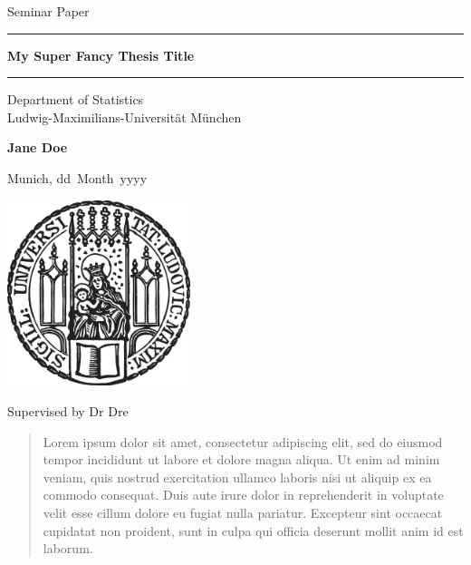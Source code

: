 \documentclass[
]{scrartcl}
\author{}
\date{\vspace{-2.5em}}
\newcommand{\mytitle}{My Super Fancy Thesis Title}
\newcommand{\myname}{Jane Doe}
\newcommand{\mysupervisor}{Dr Dre}
\newcommand{\dueday}{dd}
\newcommand{\duemonth}{Month}
\newcommand{\dueyear}{yyyy}
\begin{document}

\begin{titlepage}
\begin{center}

\LARGE
Seminar Paper

\vspace{0.5cm}

\rule{\textwidth}{1.5pt}
\LARGE
\textbf{\mytitle}
\rule{\textwidth}{1.5pt}

\vspace{0.5cm}

\large
Department of Statistics \\
Ludwig-Maximilians-Universität München

\vfill

\Large
\textbf{\myname}

\vfill

\large
Munich, \dueday~\duemonth~\dueyear

\vfill

\includegraphics[width = 0.4\textwidth]{params/sigillum.png}

\vfill

\normalsize


Supervised by \mysupervisor

\end{center}
\end{titlepage}

\newpage

\begin{abstract}

Lorem ipsum dolor sit amet, consectetur adipiscing elit, sed do eiusmod tempor
incididunt ut labore et dolore magna aliqua. Ut enim ad minim veniam, quis
nostrud exercitation ullamco laboris nisi ut aliquip ex ea commodo consequat.
Duis aute irure dolor in reprehenderit in voluptate velit esse cillum dolore eu
fugiat nulla pariatur. Excepteur sint occaecat cupidatat non proident, sunt in
culpa qui officia deserunt mollit anim id est laborum.

\end{abstract}
\end{document}
